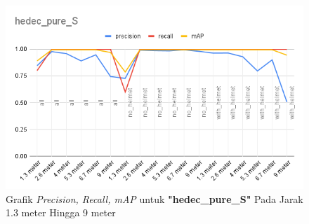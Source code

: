 \begin{enumerate}
  \begin{figure} [h!]
    \centering
    \includegraphics[width=1\textwidth]{gambar/BerdasarkanJarak/hedec_pure_S.png}
    \caption{Grafik \emph{Precision, Recall, mAP} untuk \textbf{"hedec\_pure\_S"} Pada Jarak 1.3 meter Hingga 9 meter}
    \label{fig:grafvaljarak_hedec_pure_S}  
  \end{figure}


\end{enumerate}
